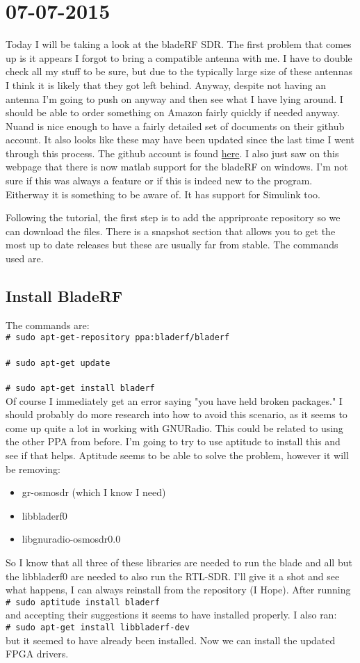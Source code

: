 \documentclass{article}
\newcommand{\shellcmd}[1]{\\\indent\indent\texttt{\footnotesize\# #1}\\}
\begin{document}
	\section{07-07-2015}
	Today I will be taking a look at the bladeRF SDR. The first problem that comes up is it appears I forgot to bring 
	a compatible antenna with me. I have to double check all my stuff to be sure, but due to the typically large size of
	these antennas I think it is likely that they got left behind. 
	Anyway, despite not having an antenna I'm going to push on anyway and then see what I have lying around. I should be able
	to order something on Amazon fairly quickly if needed anyway. Nuand is nice enough to have a fairly detailed set of
	documents on their github account. It also looks like these may have been updated since the last time I went through this
	process. The github account is found \href{https://github.com/nuand/bladeRF/wiki#Getting\_Started}{here}. I also just saw on
	this webpage that there is now matlab support for the bladeRF on windows. I'm not sure if this was always a feature 
	or if this is indeed new to the program. Eitherway it is something to be aware of. It has support for Simulink too. 
	
	Following the tutorial, the first step is to add the appriproate repository so we can download the files. There is a 
	snapshot section that allows you to get the most up to date releases but these are usually far from stable. The commands
	used are. 
	\subsection{Install BladeRF}
	The commands are:
	\shellcmd{sudo apt-get-repository ppa:bladerf/bladerf}
	\shellcmd{sudo apt-get update}
	\shellcmd{sudo apt-get install bladerf}

	Of course I immediately get an error saying "you have held broken packages." I should probably do more research into how
	to avoid this scenario, as it seems to come up quite a lot in working with GNURadio. This could be related to using the
	other PPA from before. I'm going to try to use aptitude to install this and see if that helps. Aptitude seems to be able
	to solve the problem, however it will be removing:
	\begin{itemize}
		\item gr-osmosdr (which I know I need)
		\item libbladerf0
		\item libgnuradio-osmosdr0.0
	\end{itemize} 
	So I know that all three of these libraries are needed to run the blade and all but the libbladerf0 are needed to also
	run the RTL-SDR. I'll give it a shot and see what happens, I can always reinstall from the repository (I Hope). After running 		\shellcmd{sudo aptitude install bladerf} and accepting their suggestions it seems to have installed properly. I also ran:
	\shellcmd {sudo apt-get install libbladerf-dev} but it seemed to have already been installed. Now we can install the 
	updated FPGA drivers. 
\end{document}
